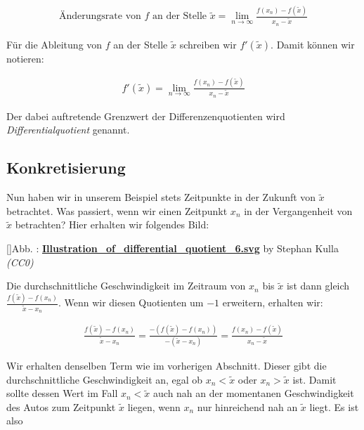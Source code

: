 \documentclass[fontsize=9pt,
               parskip=half-,
               DIV=14,
               listof=chapterentry,
               tocflat]{scrbook}
\newcounter{imagelabel}
\begin{document}
\begin{align*}
{\text{Änderungsrate von }}f{\text{ an der Stelle }}{\tilde {x}}=\lim _{n\to \infty }{\frac {f(x_{n})-f({\tilde {x}})}{x_{n}-{\tilde {x}}}}
\end{align*}

Für die Ableitung von $f$ an der Stelle ${\tilde {x}}$ schreiben wir $f'({\tilde {x}})$. Damit können wir notieren:

\begin{align*}
f'({\tilde {x}})=\lim _{n\to \infty }{\frac {f(x_{n})-f({\tilde {x}})}{x_{n}-{\tilde {x}}}}
\end{align*}

Der dabei auftretende Grenzwert der Differenzenquotienten wird \emph{Differentialquotient} genannt.

\subsection{Konkretisierung}

Nun haben wir in unserem Beispiel stets Zeitpunkte in der Zukunft von ${\tilde {x}}$ betrachtet. Was passiert, wenn wir einen Zeitpunkt $x_{n}$ in der Vergangenheit von ${\tilde {x}}$ betrachten? Hier erhalten wir folgendes Bild:

[]{Abb. : \protect\href{https://commons.wikimedia.org/wiki/File:Illustration_of_differential_quotient_6.svg}{\textbf{Illustration\allowbreak\_of\allowbreak\_differential\allowbreak\_quotient\allowbreak\_6.svg}} by Stephan Kulla \textit{(CC0)}}\begin{center}
\end{center}

Die durchschnittliche Geschwindigkeit im Zeitraum von $x_{n}$ bis ${\tilde {x}}$ ist dann gleich ${\tfrac {f({\tilde {x}})-f(x_{n})}{{\tilde {x}}-x_{n}}}$. Wenn wir diesen Quotienten um $-1$ erweitern, erhalten wir:

\begin{align*}
{\frac {f({\tilde {x}})-f(x_{n})}{{\tilde {x}}-x_{n}}}={\frac {-\left(f({\tilde {x}})-f(x_{n})\right)}{-({\tilde {x}}-x_{n})}}={\frac {f(x_{n})-f({\tilde {x}})}{x_{n}-{\tilde {x}}}}
\end{align*}

Wir erhalten denselben Term wie im vorherigen Abschnitt. Dieser gibt die durchschnittliche Geschwindigkeit an, egal ob $x_{n}<{\tilde {x}}$ oder $x_{n}>{\tilde {x}}$ ist. Damit sollte dessen Wert im Fall $x_{n}<{\tilde {x}}$ auch nah an der momentanen Geschwindigkeit des Autos zum Zeitpunkt ${\tilde {x}}$ liegen, wenn $x_{n}$ nur hinreichend nah an ${\tilde {x}}$ liegt. Es ist also
\end{document}

